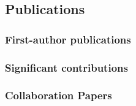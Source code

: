 \documentclass[12pt,letterpaper]{article}
\begin{document}
\ifdefined\withpubs
  \subsection{Publications}
  

  \subsubsection{First-author publications}
\begin{list}{}{\cvlist}
   
\end{list}

\subsubsection{Significant contributions}
\begin{list}{}{\cvlist}
  
\end{list}

\subsubsection{Collaboration Papers}
\begin{list}{}{\cvlist}
  
\end{list}
\fi
\end{document}
